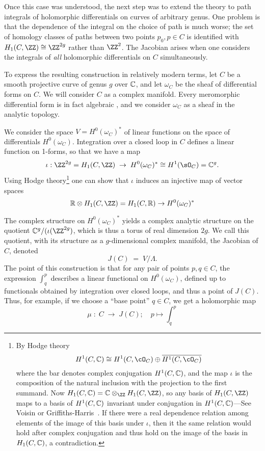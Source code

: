 Once this case was understood, the next step was to extend the theory to path integrals of holomorphic differentials on curves of arbitrary genus. One problem is that the dependence of the integral on the choice of path is much worse; the set of homology classes of paths between two points $p_0, p \in C$ is identified with $H_1(C,\ZZ) \cong \ZZ^{2g}$ rather than $\ZZ^2$. The Jacobian arises when one considers the integrals of \emph{all} holomorphic differentials on $C$ simultaneously. 

To express the resulting construction in relatively modern terms, let $C$ be a smooth projective curve of genus $g$ over $\CC$, and let $\omega_{C}$ be the sheaf of differential forms on $C$. We will consider $C$ as a complex manifold. Every meromorphic differential form is in fact algebraic
\cite{****}, and we consider $\omega_{C}$ as a sheaf in the analytic topology.

We consider the space $V = H^0(\omega_C)^*$ of linear functions on the space of differentials $H^0(\omega_C)$.  Integration over a closed loop in $C$ defines a linear function on 1-forms, so that we have a map
$$
\iota: \ZZ^{2g} = H_1(C,\ZZ) \; \to \;  H^0(\omega_C)^* \cong H^1(\sO_C) = \CC^{g}.
$$
Using  Hodge theory\footnote{By Hodge theory 
$$
H^1(C, \CC) \cong H^1(C, \cO_C) \oplus \overline{H^1(C, \cO_C)}
$$
where the bar denotes complex conjugation $H^1(C, \CC)$, and the map $\iota$ is the composition of 
 the natural inclusion with the projection to the first summand.
 Now
$H_1(C,\CC) = \CC\otimes_\ZZ H_1(C,\ZZ)$, so any basis of $H_1(C,\ZZ)$ maps to a basis of 
 $H^1(C, \CC)$ invariant under conjugation in $H^1(C, \CC)$---See Voisin \cite{} or Griffiths-Harris~\cite{}. 
  If there were a real dependence relation among elements 
 of the image of this basis under $\iota$, then it the same relation would hold after complex
 conjugation and thus hold on the image of the basis in $H_1(C,\CC)$, a contradiction. 
}
one can show that $\iota$ induces an injective map of vector spaces 
$$
\RR \otimes H_1(C,\ZZ) = H_1(C,\RR) \to H^0(\omega_C)^*
$$

 The complex structure on $H^0(\omega_C)^*$ yields a complex analytic structure on the quotient $\CC^{g}/(\iota(\ZZ^{2g})$, which is thus a torus of real dimension $2g$.  We call this quotient, with its structure as a $g$-dimensional complex manifold, the Jacobian of $C$, denoted
$$
J(C) \; = \; V/\Lambda.
$$
The point of this construction is that for any pair of points $p, q \in C$, the expression $\int_q^p$ describes a linear functional on $H^0(\omega_C)$, defined up to functionals obtained by integration over closed loops, and thus a point of $J(C)$. Thus, for example, if we choose a ``base point''  $q\in C$, we get a holomorphic map
$$
\mu \; : \; C \; \to \; J(C); \quad p\mapsto \int_{q}^{p}
$$

